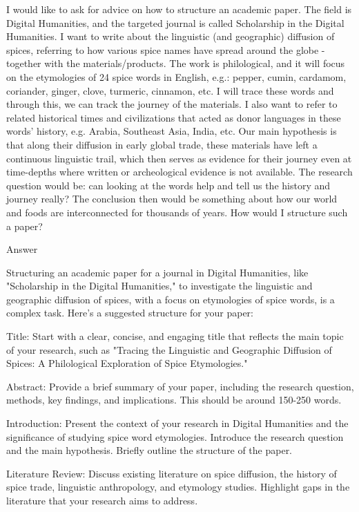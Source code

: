 \documentclass[12pt]{article}
\begin{document}
I would like to ask for advice on how to structure an academic paper. The field is Digital Humanities, and the targeted journal is called Scholarship in the Digital Humanities. I want to write about the linguistic (and geographic) diffusion of spices, referring to how various spice names have spread around the globe - together with the materials/products. The work is philological, and it will focus on the etymologies of 24 spice words in English, e.g.: pepper, cumin, cardamom, coriander, ginger, clove, turmeric, cinnamon, etc. I will trace these words and through this, we can track the journey of the materials. I also want to refer to related historical times and civilizations that acted as donor languages in these words' history, e.g. Arabia, Southeast Asia, India, etc. Our main hypothesis is that along their diffusion in early global trade, these materials have left a continuous linguistic trail, which then serves as evidence for their journey even at time-depths where written or archeological evidence is not available. The research question would be: can looking at the words help and tell us the history and journey really? The conclusion then would be something about how our world and foods are interconnected for thousands of years. How would I structure such a paper?

Answer

Structuring an academic paper for a journal in Digital Humanities, like "Scholarship in the Digital Humanities," to investigate the linguistic and geographic diffusion of spices, with a focus on etymologies of spice words, is a complex task. Here's a suggested structure for your paper:

    Title: Start with a clear, concise, and engaging title that reflects the main topic of your research, such as "Tracing the Linguistic and Geographic Diffusion of Spices: A Philological Exploration of Spice Etymologies."

    Abstract: Provide a brief summary of your paper, including the research question, methods, key findings, and implications. This should be around 150-250 words.

    Introduction:
        Present the context of your research in Digital Humanities and the significance of studying spice word etymologies.
        Introduce the research question and the main hypothesis.
        Briefly outline the structure of the paper.

    Literature Review:
        Discuss existing literature on spice diffusion, the history of spice trade, linguistic anthropology, and etymology studies.
        Highlight gaps in the literature that your research aims to address.
\end{document}
